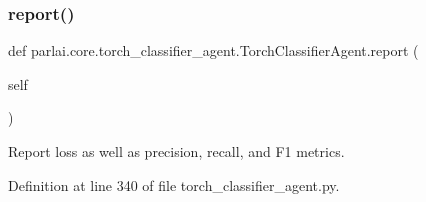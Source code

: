 \subsubsection{\texorpdfstring{report()}{report()}}
{\footnotesize\ttfamily def parlai.\+core.\+torch\+\_\+classifier\+\_\+agent.\+Torch\+Classifier\+Agent.\+report (\begin{DoxyParamCaption}\item[{}]{self }\end{DoxyParamCaption})}

\begin{DoxyVerb}Report loss as well as precision, recall, and F1 metrics.
\end{DoxyVerb}
 

Definition at line 340 of file torch\+\_\+classifier\+\_\+agent.\+py.


